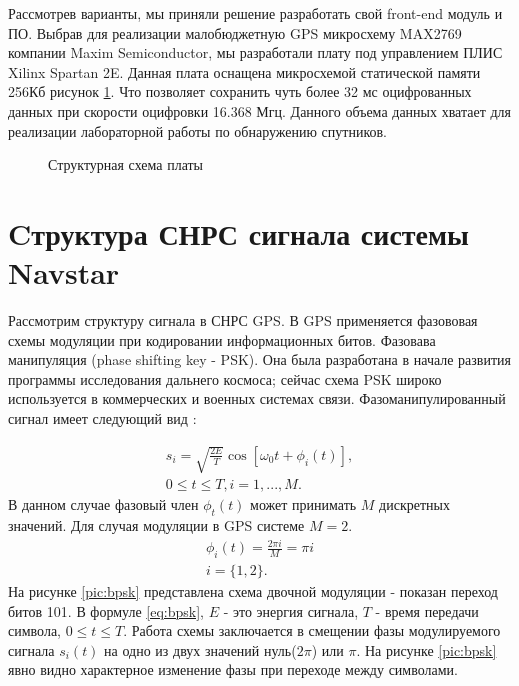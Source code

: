 \documentclass[a4paper,12pt]{article}
\numberwithin{table}{section}
\begin{document}
Рассмотрев варианты, мы приняли решение разработать свой front-end модуль и ПО.
Выбрав для реализации малобюджетную GPS микросхему MAX2769 компании Maxim Semiconductor, мы разработали плату под управлением ПЛИС Xilinx Spartan 2E.
Данная плата оснащена микросхемой статической памяти 256Кб рисунок \ref{pic:our-board}.
Что позволяет сохранить чуть более 32 мс оцифрованных данных при скорости оцифровки 16.368 Мгц.
Данного объема данных хватает для реализации лабораторной работы по обнаружению спутников.

\begin{figure}[h]
\begin{center}
\end{center}
\caption{Структурная схема платы}
\label{pic:our-board}
\end{figure}

\section{Cтруктура СНРС сигнала системы Navstar}

Рассмотрим структуру сигнала в СНРС GPS. В GPS применяется фазововая схемы модуляции при кодировании информационных битов.
Фазовава манипуляция (phase shifting key - PSK).  Она была разработана  в начале развития программы исследования дальнего космоса;
сейчас схема PSK широко используется в коммерческих и военных системах связи. Фазоманипулированный сигнал имеет следующий вид \cite{sklyar}:

\begin{eqnarray}
s_i=\sqrt{\frac{2E}{T}}\cos{[{{\omega}_0}t + \phi_i(t)]}, \nonumber \\
	0\leq{t}\leq{T}, i = 1, ..., M.
\label{eq:bpsk}
\end{eqnarray}
В данном случае фазовый член ${\phi_t(t)}$ может принимать ${M}$ дискретных значений. Для случая модуляции в GPS системе ${M=2}$.
\begin{eqnarray}
	\phi_i(t)=\frac{2\pi{i}}{M}=\pi{i} \nonumber \\
	i = \{1,2\}.
\label{eq:bpsk_phi}
\end{eqnarray}
На рисунке \ref{pic:bpsk} представлена схема двочной модуляции - показан переход битов 101. В формуле \ref{eq:bpsk}, ${E}$ - это энергия
сигнала, ${T}$ - время передачи символа, ${0\leq{t}\leq{T}}$. Работа схемы заключается в смещении фазы модулируемого сигнала
${s_i(t)}$ на одно из двух значений нуль(${2\pi}$) или ${\pi}$. На рисунке \ref{pic:bpsk} явно видно характерное изменение фазы при 
переходе между символами.
\end{document}
